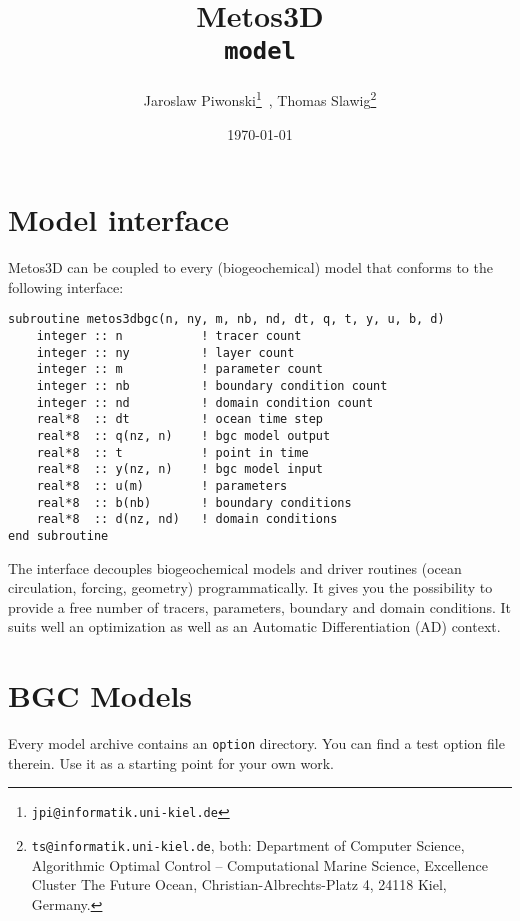 \documentclass{article}
\begin{document}
%
%
\title{
Metos3D \\
\medskip
\texttt{model}
}
\author{
Jaroslaw Piwonski\thanks{\texttt{jpi@informatik.uni-kiel.de}} \,,
Thomas Slawig\thanks{\texttt{ts@informatik.uni-kiel.de},
both: Department of Computer Science, Algorithmic Optimal Control -- Computational Marine Science,
Excellence Cluster The Future Ocean, Christian-Albrechts-Platz 4, 24118 Kiel, Germany.}
}
\date{\today}
\maketitle

%
%
\section{Model interface}

Metos3D can be coupled to every (biogeochemical) model that conforms to the following interface:

\begin{verbatim}
subroutine metos3dbgc(n, ny, m, nb, nd, dt, q, t, y, u, b, d)
    integer :: n           ! tracer count
    integer :: ny          ! layer count
    integer :: m           ! parameter count
    integer :: nb          ! boundary condition count
    integer :: nd          ! domain condition count
    real*8  :: dt          ! ocean time step
    real*8  :: q(nz, n)    ! bgc model output
    real*8  :: t           ! point in time
    real*8  :: y(nz, n)    ! bgc model input
    real*8  :: u(m)        ! parameters
    real*8  :: b(nb)       ! boundary conditions
    real*8  :: d(nz, nd)   ! domain conditions
end subroutine
\end{verbatim}

The interface decouples biogeochemical models and driver routines
(ocean circulation, forcing, geometry) programmatically.
%
It gives you the possibility to provide a free number of tracers,
parameters, boundary and domain conditions. It suits well an
optimization as well as an Automatic Differentiation (AD) context.
%


%
%
\section{BGC Models}

Every model archive contains an \texttt{option} directory.
%
You can find a test option file therein.
%
Use it as a starting point for your own work.
\end{document}
